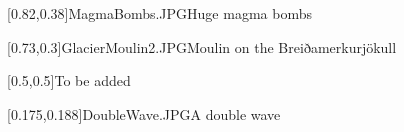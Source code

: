 



\graphicspath{{Figures/}{Figures/Iceland/}}


\subtitle{Day 4}
\date{29.10.2019}


    
    [0.82,0.38]{MagmaBombs.JPG}{Huge magma bombs}
    
    [0.73,0.3]{GlacierMoulin2.JPG}{Moulin on the Breiðamerkurj\"okull}
    
    [0.5,0.5]{}{To be added}
    
    [0.175,0.188]{DoubleWave.JPG}{A double wave}
    
    

